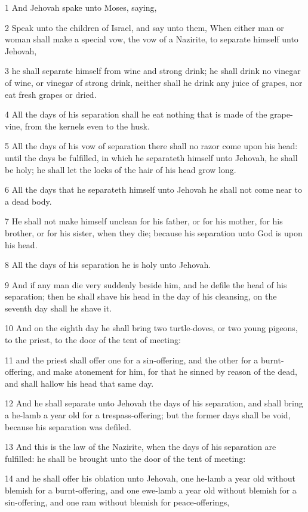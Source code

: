 \par 1 And Jehovah spake unto Moses, saying,
\par 2 Speak unto the children of Israel, and say unto them, When either man or woman shall make a special vow, the vow of a Nazirite, to separate himself unto Jehovah,
\par 3 he shall separate himself from wine and strong drink; he shall drink no vinegar of wine, or vinegar of strong drink, neither shall he drink any juice of grapes, nor eat fresh grapes or dried.
\par 4 All the days of his separation shall he eat nothing that is made of the grape-vine, from the kernels even to the husk.
\par 5 All the days of his vow of separation there shall no razor come upon his head: until the days be fulfilled, in which he separateth himself unto Jehovah, he shall be holy; he shall let the locks of the hair of his head grow long.
\par 6 All the days that he separateth himself unto Jehovah he shall not come near to a dead body.
\par 7 He shall not make himself unclean for his father, or for his mother, for his brother, or for his sister, when they die; because his separation unto God is upon his head.
\par 8 All the days of his separation he is holy unto Jehovah.
\par 9 And if any man die very suddenly beside him, and he defile the head of his separation; then he shall shave his head in the day of his cleansing, on the seventh day shall he shave it.
\par 10 And on the eighth day he shall bring two turtle-doves, or two young pigeons, to the priest, to the door of the tent of meeting:
\par 11 and the priest shall offer one for a sin-offering, and the other for a burnt-offering, and make atonement for him, for that he sinned by reason of the dead, and shall hallow his head that same day.
\par 12 And he shall separate unto Jehovah the days of his separation, and shall bring a he-lamb a year old for a trespass-offering; but the former days shall be void, because his separation was defiled.
\par 13 And this is the law of the Nazirite, when the days of his separation are fulfilled: he shall be brought unto the door of the tent of meeting:
\par 14 and he shall offer his oblation unto Jehovah, one he-lamb a year old without blemish for a burnt-offering, and one ewe-lamb a year old without blemish for a sin-offering, and one ram without blemish for peace-offerings,
